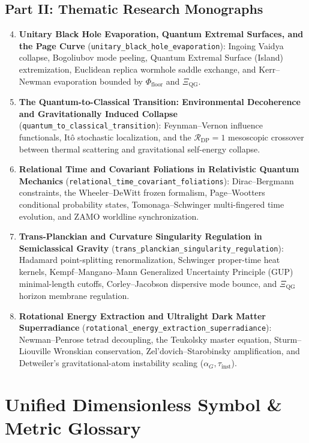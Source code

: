 \documentclass[11pt,a4paper]{article}
\begin{document}
\subsection*{Part II: Thematic Research Monographs}
\begin{enumerate}
    \setcounter{enumi}{3}
    \item \textbf{Unitary Black Hole Evaporation, Quantum Extremal Surfaces, and the Page Curve} (\texttt{unitary\_black\_hole\_evaporation}): Ingoing Vaidya collapse, Bogoliubov mode peeling, Quantum Extremal Surface (Island) extremization, Euclidean replica wormhole saddle exchange, and Kerr--Newman evaporation bounded by $\Phi_{\mathrm{floor}}$ and $\Xi_{\mathrm{QG}}$.
    \item \textbf{The Quantum-to-Classical Transition: Environmental Decoherence and Gravitationally Induced Collapse} (\texttt{quantum\_to\_classical\_transition}): Feynman--Vernon influence functionals, It\^o stochastic localization, and the $\mathcal{R}_{\mathrm{DP}} = 1$ mesoscopic crossover between thermal scattering and gravitational self-energy collapse.
    \item \textbf{Relational Time and Covariant Foliations in Relativistic Quantum Mechanics} (\texttt{relational\_time\_covariant\_foliations}): Dirac--Bergmann constraints, the Wheeler--DeWitt frozen formalism, Page--Wootters conditional probability states, Tomonaga--Schwinger multi-fingered time evolution, and ZAMO worldline synchronization.
    \item \textbf{Trans-Planckian and Curvature Singularity Regulation in Semiclassical Gravity} (\texttt{trans\_planckian\_singularity\_regulation}): Hadamard point-splitting renormalization, Schwinger proper-time heat kernels, Kempf--Mangano--Mann Generalized Uncertainty Principle (GUP) minimal-length cutoffs, Corley--Jacobson dispersive mode bounce, and $\Xi_{\mathrm{QG}}$ horizon membrane regulation.
    \item \textbf{Rotational Energy Extraction and Ultralight Dark Matter Superradiance} (\texttt{rotational\_energy\_extraction\_superradiance}): Newman--Penrose tetrad decoupling, the Teukolsky master equation, Sturm--Liouville Wronskian conservation, Zel'dovich--Starobinsky amplification, and Detweiler's gravitational-atom instability scaling ($\alpha_G, \tau_{\mathrm{inst}}$).
\end{enumerate}

\section{Unified Dimensionless Symbol \& Metric Glossary}
\end{document}
